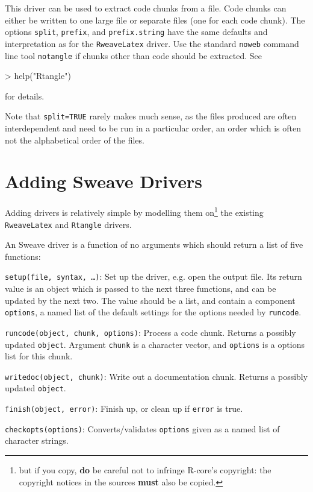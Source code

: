 \documentclass[a4paper]{article}
\begin{document}
This driver can be used to extract \R{} code chunks from a 
file. Code chunks can either be written to one large file or separate
files (one for each code chunk). The options \texttt{split},
\texttt{prefix}, and \texttt{prefix.string} have the same defaults and
interpretation as for the \texttt{RweaveLatex} driver. Use the
standard \texttt{noweb} command line tool \texttt{notangle} if chunks
other than \R{} code should be extracted. See
\begin{Schunk}
\begin{Sinput}
> help("Rtangle")
\end{Sinput}
\end{Schunk}
for details.

Note that \texttt{split=TRUE} rarely makes much sense, as the files
produced are often interdependent and need to be run in a particular
order, an order which is often not the alphabetical order of the
files.


\section{Adding Sweave Drivers}

Adding drivers is relatively simple by modelling them on\footnote{but
  if you copy, \textbf{do} be careful not to infringe R-core's
  copyright: the copyright notices in the \R{} sources \textbf{must} also
  be copied.} the existing \texttt{RweaveLatex} and \texttt{Rtangle}
drivers.

An Sweave driver is a function of no arguments which should return a
list of five functions:
\begin{description}
\item{\texttt{setup(file, syntax, \dots)}:} Set up the driver, e.g.{}
    open the output file.  Its return value is an object which is
    passed to the next three functions, and can be updated by the next
    two.  The value should be a list, and contain a component
    \texttt{options}, a named list of the default settings for the
    options needed by \texttt{runcode}.
\item{\texttt{runcode(object, chunk, options)}:} Process a code
    chunk.  Returns a possibly updated \texttt{object}.  Argument
    \texttt{chunk} is a character vector, and \texttt{options} is a
    options list for this chunk.
\item{\texttt{writedoc(object, chunk)}:} Write out a documentation
    chunk.  Returns a possibly updated \texttt{object}.
\item{\texttt{finish(object, error)}:} Finish up, or clean up if
    \texttt{error} is true.
\item{\texttt{checkopts(options)}:} Converts/validates \texttt{options}
    given as a named list of character strings.
\end{description}
\end{document}
